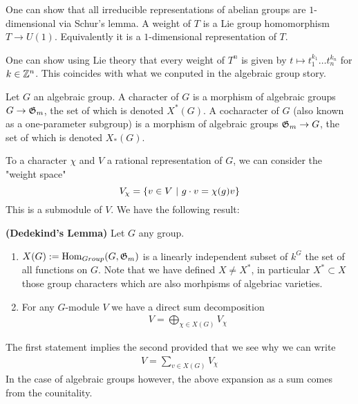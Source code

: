 \documentclass[12pt]{article}
\begin{document}
One can show that all irreducible representations of abelian groups are $1$-dimensional via Schur's lemma. A weight of $T$ is a Lie group homomorphism $T\to U(1)$. Equivalently it is a $1$-dimensional representation of $T$. 

\begin{fact}
    One can show using Lie theory that every weight of $T^n$ is given by $t\mapsto t_1^{k_1}\dots t_n^{k_n}$ for $k\in\mathbb{Z}^n$. This coincides with what we conputed in the algebraic group story.
\end{fact}


\hfill 


\begin{definition}
    Let $G$ an algebraic group. A character of $G$ is a morphism of algebraic groups $G\to \mathfrak{G}_m$, the set of which is denoted $X^*(G)$. A cocharacter of $G$ (also known as a one-parameter subgroup) is a morphism of algebraic groups $\mathfrak{G}_m\to G$, the set of which is denoted $X_*(G)$. 
\end{definition}
To a character $\chi$ and $V$ a rational representation of $G$, we can consider the "weight space" \[V_\chi = \{v\in V\ \vert \  g\cdot v = \chi(g)v\}\] This is a submodule of $V$. We have the following result:\begin{lemma}
    \textbf{(Dedekind's Lemma)} Let $G$ any group. \begin{enumerate}
        \item $X(G):=\operatorname{Hom}_{Group}(G,\mathfrak{G}_m)$ is a linearly independent subset of $k^G$ the set of all functions on $G$. Note that we have defined $X \neq X^*$, in particular $X^*\subset X$ those group characters which are also morhpisms of algebriac varieties. 
        \item For any $G$-module $V$ we have a direct sum decomposition \begin{align*}
            V = \bigoplus_{\chi\in X(G)}V_\chi
        \end{align*}
    \end{enumerate}
\end{lemma} The first statement implies the second provided that we see why we can write \begin{align*}
    V = \sum_{v\in X(G)}V_\chi
\end{align*}  In the case of algebraic groups however, the above expansion as a sum comes from the counitality.
\end{document}
